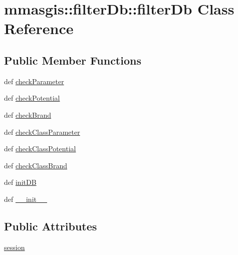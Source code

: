 \hypertarget{classmmasgis_1_1filterDb_1_1filterDb}{
\section{mmasgis::filterDb::filterDb Class Reference}
\label{classmmasgis_1_1filterDb_1_1filterDb}
}
\subsection*{Public Member Functions}
\begin{DoxyCompactItemize}
\item 
def \hyperlink{classmmasgis_1_1filterDb_1_1filterDb_a454ac2a207334ed58dfd4e926bae613e}{checkParameter}
\item 
def \hyperlink{classmmasgis_1_1filterDb_1_1filterDb_a263f7d5245d91b81bd7c4c25b0188b2b}{checkPotential}
\item 
def \hyperlink{classmmasgis_1_1filterDb_1_1filterDb_a275775e934063e23e96be6f2e4ed2508}{checkBrand}
\item 
def \hyperlink{classmmasgis_1_1filterDb_1_1filterDb_a82bf0d588278b10cf0f3df354ebee17c}{checkClassParameter}
\item 
def \hyperlink{classmmasgis_1_1filterDb_1_1filterDb_a5ad0b32d554293bd9f79ca082f945eb7}{checkClassPotential}
\item 
def \hyperlink{classmmasgis_1_1filterDb_1_1filterDb_a2092be7a5c6ab1fb54df92353d07a313}{checkClassBrand}
\item 
def \hyperlink{classmmasgis_1_1filterDb_1_1filterDb_a5d97442632095c15a2c69be8ffd6657f}{initDB}
\item 
def \hyperlink{classmmasgis_1_1filterDb_1_1filterDb_a75d47b1f30fb6a3232d88656ef04e326}{\_\-\_\-init\_\-\_\-}
\end{DoxyCompactItemize}
\subsection*{Public Attributes}
\begin{DoxyCompactItemize}
\item 
\hyperlink{classmmasgis_1_1filterDb_1_1filterDb_ad93529109045c7cf257066090a8aefe7}{session}
\end{DoxyCompactItemize}


